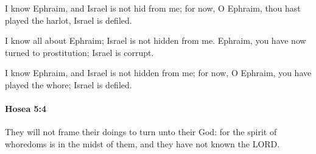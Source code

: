 			\begin{versebox}
					\item[BHS] 
					\item[LXX] 
					\item[ASV] I know Ephraim, and Israel is not hid from me; for now, O Ephraim, thou hast played the harlot, Israel is defiled.
					\item[NIV] I know all about Ephraim; Israel is not hidden from me. Ephraim, you have now turned to prostitution; Israel is corrupt.
					\item[NRSV] I know Ephraim, and Israel is not hidden from me; for now, O Ephraim, you have played the whore; Israel is defiled.
			\end{versebox}

		\paragraph{Hosea 5:4} %
			\label{HOSEA-5-4}

			They will not frame their doings to turn unto their God: for the spirit of whoredoms is in the midst of them, and they have not known the LORD.

